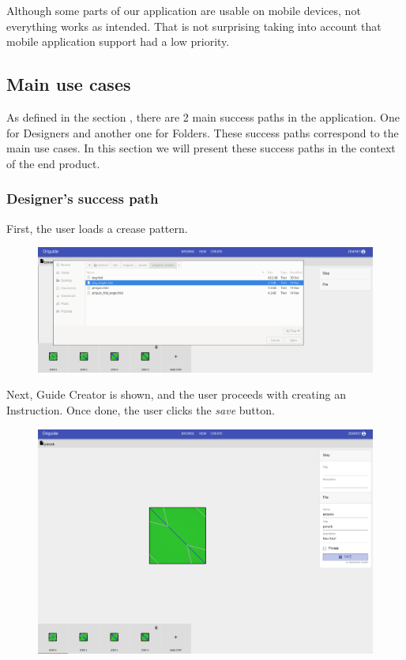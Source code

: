 Although some parts of our application are usable on mobile devices, 
not everything works as intended. That is not surprising taking into account that
mobile application support had a low priority.

\subsection{Main use cases}

As defined in the section , there are 2 main 
success paths in the application.
One for Designers and another one for Folders.
These success paths correspond to the main use cases.
In this section we will present these success paths in the context of the end product.

\subsubsection{Designer's success path}

First, the user loads a crease pattern.

\begin{figure}[H]
  	\centering
    \includegraphics[width=\textwidth]{assets/5-designerLoad.png}
\end{figure}

Next, Guide Creator is shown, and the user proceeds with creating an Instruction.
Once done, the user clicks the \textit{save} button.

\begin{figure}[H]
  	\centering
    \includegraphics[width=\textwidth]{assets/5-designerSave.png}
\end{figure}


